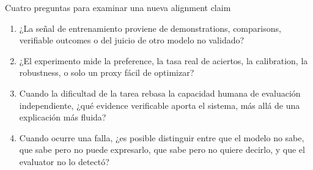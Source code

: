 \begin{knowledgebox}{Cuatro preguntas para examinar una nueva alignment claim}
\begin{enumerate}
  \item ¿La señal de entrenamiento proviene de demonstrations, comparisons, verifiable outcomes o del juicio de otro modelo no validado?
  \item ¿El experimento mide la preference, la tasa real de aciertos, la calibration, la robustness, o solo un proxy fácil de optimizar?
  \item Cuando la dificultad de la tarea rebasa la capacidad humana de evaluación independiente, ¿qué evidence verificable aporta el sistema, más allá de una explicación más fluida?
  \item Cuando ocurre una falla, ¿es posible distinguir entre que el modelo no sabe, que sabe pero no puede expresarlo, que sabe pero no quiere decirlo, y que el evaluator no lo detectó?
\end{enumerate}
\end{knowledgebox}


